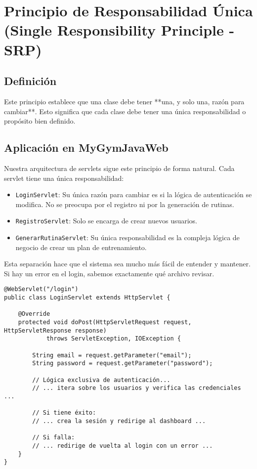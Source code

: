 \documentclass[11pt,a4paper]{article}
\begin{document}

\section{Principio de Responsabilidad Única (Single Responsibility Principle - SRP)}
\subsection{Definición}
Este principio establece que una clase debe tener **una, y solo una, razón para cambiar**. Esto significa que cada clase debe tener una única responsabilidad o propósito bien definido.
\subsection{Aplicación en MyGymJavaWeb}
Nuestra arquitectura de servlets sigue este principio de forma natural. Cada servlet tiene una única responsabilidad:
\begin{itemize}
    \item \texttt{LoginServlet}: Su única razón para cambiar es si la lógica de autenticación se modifica. No se preocupa por el registro ni por la generación de rutinas.
    \item \texttt{RegistroServlet}: Solo se encarga de crear nuevos usuarios.
    \item \texttt{GenerarRutinaServlet}: Su única responsabilidad es la compleja lógica de negocio de crear un plan de entrenamiento.
\end{itemize}
Esta separación hace que el sistema sea mucho más fácil de entender y mantener. Si hay un error en el login, sabemos exactamente qué archivo revisar.
\begin{lstlisting}[caption={\texttt{LoginServlet.java}, un ejemplo de SRP}]
@WebServlet("/login")
public class LoginServlet extends HttpServlet {

    @Override
    protected void doPost(HttpServletRequest request, HttpServletResponse response)
            throws ServletException, IOException {

        String email = request.getParameter("email");
        String password = request.getParameter("password");

        // Lógica exclusiva de autenticación...
        // ... itera sobre los usuarios y verifica las credenciales ...

        // Si tiene éxito:
        // ... crea la sesión y redirige al dashboard ...

        // Si falla:
        // ... redirige de vuelta al login con un error ...
    }
}
\end{lstlisting}
\end{document}
